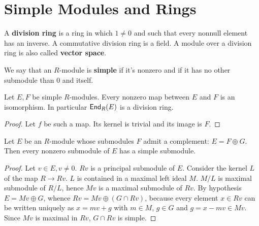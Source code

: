 \section{Simple Modules and Rings}

A \textbf{division ring} is a ring in which $1\neq 0$ and such that every nonnull element has an inverse. 
A commutative division ring is a field. A module over a division ring is also called \textbf{vector space}.
 
We say that an $R$-module is \textbf{simple} if it's nonzero and if it has no other submodule than $0$ and itself. 

\begin{thm} Let $E,F$ be simple $R$-modules.
Every nonzero map between $E$ and $F$ is an isomorphism. 
In particular $\operatorname{\sf{End}}_R(E)$ is a division ring. 
\begin{proof} 
Let $f$ be such a map. 
Its kernel is trivial and its image is $F$.  
\end{proof}
\end{thm}

\begin{lem} Let $E$ be an $R$-module whose submodules $F$ admit a complement: $E=F\oplus G$.
Then every nonzero submodule of $E$ has a simple submodule. 
\begin{proof}
Let $v \in E, v \neq 0$. $Rv$ is a principal submodule of $E$. 
Consider the kernel $L$ of the map $R \to Rv$. 
$L$ is contained in a maximal left ideal $M$. 
$M/L$ is  maximal submodule of $R/L$, hence $Mv$ is a maximal submodule of $Rv$. 
By hypothesis $E=Mv \oplus G$, whence $Rv = Mv \oplus (G \cap Rv)$, because every element $x \in Rv$ can be written uniquely as $x=mv+g$ with $m \in M$, $g \in G$ and $g = x - mv \in Mv$. 
Since $Mv$ is maximal in $Rv$, $G \cap Rv$ is simple.  
\end{proof}
\end{lem} 

